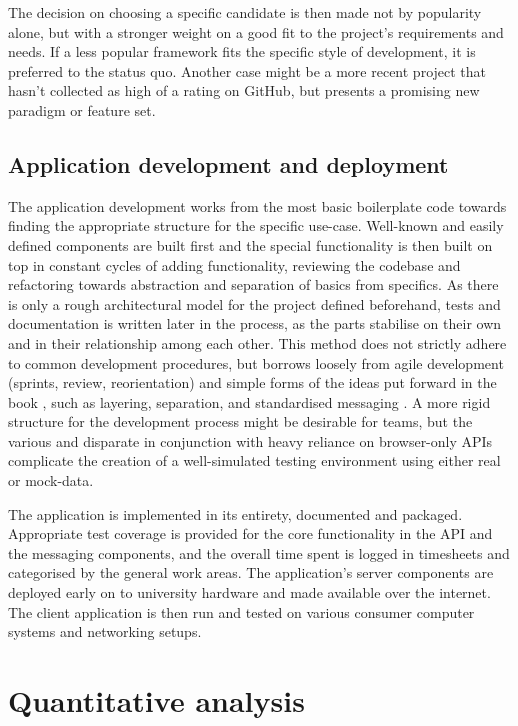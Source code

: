 The decision on choosing a specific candidate is then made not by popularity alone, but with a stronger weight on a good fit to the project's requirements and needs. If a less popular framework fits the specific style of development, it is preferred to the status quo. Another case might be a more recent project that hasn't collected as high of a rating on GitHub, but presents a promising new paradigm or feature set.

\subsection{Application development and deployment}

The application development works from the most basic boilerplate code towards finding the appropriate structure for the specific use-case. Well-known and easily defined components are built first and the special functionality is then built on top in constant cycles of adding functionality, reviewing the codebase and refactoring towards abstraction and separation of basics from specifics. As there is only a rough architectural model for the project defined beforehand, tests and documentation is written later in the process, as the parts stabilise on their own and in their relationship among each other. This method does not strictly adhere to common development procedures, but borrows loosely from agile development (sprints, review, reorientation) and simple forms of the ideas put forward in the book , such as layering, separation, and standardised messaging \parencite{patternOrientedSoftwareArchitecture}. A more rigid structure for the development process might be desirable for teams, but the various and disparate  in conjunction with heavy reliance on browser-only \ac{API}s complicate the creation of a well-simulated testing environment using either real or mock-data.

The application is implemented in its entirety, documented and packaged. Appropriate test coverage is provided for the core functionality in the API and the messaging components, and the overall time spent is logged in timesheets and categorised by the general work areas. The application's server components are deployed early on to university hardware and made available over the internet. The client application is then run and tested on various consumer computer systems and networking setups.

\section{Quantitative analysis}


